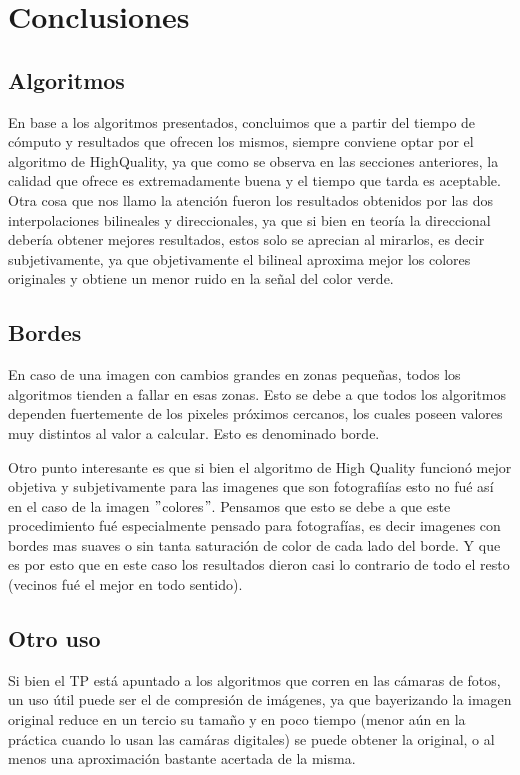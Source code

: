 \section{Conclusiones}



\subsection{Algoritmos}
En base a los algoritmos presentados, concluimos que a partir del tiempo de cómputo y resultados que ofrecen los mismos, siempre conviene optar por el algoritmo de HighQuality, ya que como se observa en las secciones anteriores, la calidad que ofrece es extremadamente buena y el tiempo que tarda es aceptable.
Otra cosa que nos llamo la atención fueron los resultados obtenidos por las dos interpolaciones bilineales y direccionales, ya que si bien en teoría la direccional debería obtener mejores resultados, estos solo se aprecian al mirarlos, es decir subjetivamente, ya que objetivamente el bilineal aproxima mejor los colores originales y obtiene un menor ruido en la señal del color verde.

\subsection{Bordes}
En caso de una imagen con cambios grandes en zonas pequeñas, todos los algoritmos tienden a fallar en esas zonas.
Esto se debe a que todos los algoritmos dependen fuertemente de los pixeles próximos cercanos, los cuales poseen valores muy distintos al valor a calcular. Esto es denominado borde.

Otro punto interesante es que si bien el algoritmo de High Quality funcionó mejor objetiva y subjetivamente para las imagenes que son fotografiías esto no fué así en el caso de la imagen $"$colores$"$. Pensamos que esto se debe a que este procedimiento fué especialmente pensado para fotografías, es decir imagenes con bordes mas suaves o sin tanta saturación de color de cada lado del borde. Y que es por esto que en este caso los resultados dieron casi lo contrario de todo el resto (vecinos fué el mejor en todo sentido).

\subsection{Otro uso}
Si bien el TP está apuntado a los algoritmos que corren en las cámaras de fotos, un uso útil puede ser el de compresión de imágenes, ya que bayerizando la imagen original reduce en un tercio su tamaño y en poco tiempo (menor aún en la práctica cuando lo usan las camáras digitales) se puede obtener la original, o al menos una aproximación bastante acertada de la misma.
